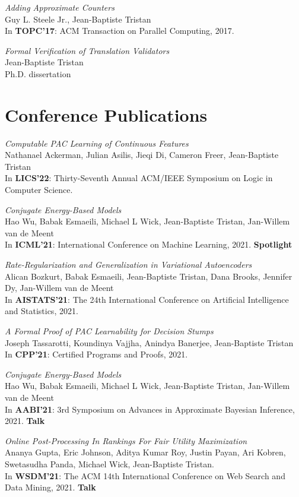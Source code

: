 \documentclass[margin,line]{res}
\begin{document}
\begin{resume}
\emph{Adding Approximate Counters}\\
Guy L. Steele Jr., Jean-Baptiste Tristan\\
In {\bf TOPC'17}: ACM Transaction on Parallel Computing, 2017.

\emph{Formal Verification of Translation Validators}\\
Jean-Baptiste Tristan\\
Ph.D. dissertation

\section{\sc Conference Publications}

\emph{Computable PAC Learning of Continuous Features}\\
Nathanael Ackerman, Julian Asilis, Jieqi Di, Cameron Freer, Jean-Baptiste Tristan\\
In {\bf LICS'22}: Thirty-Seventh Annual ACM/IEEE Symposium on
Logic in Computer Science.

\emph{Conjugate Energy-Based Models}\\
Hao Wu, Babak Esmaeili, Michael L Wick, Jean-Baptiste Tristan, Jan-Willem van de Meent\\
In {\bf ICML'21}: International Conference on Machine Learning, 2021. {\bf Spotlight}

\emph{Rate-Regularization and Generalization in Variational Autoencoders}\\
Alican Bozkurt, Babak Esmaeili, Jean-Baptiste Tristan, Dana Brooks, Jennifer Dy, Jan-Willem van de Meent\\
In {\bf AISTATS'21}: The 24th International Conference on
Artificial Intelligence and Statistics, 2021.

\emph{A Formal Proof of PAC Learnability for Decision Stumps}\\
Joseph Tassarotti, Koundinya Vajjha, Anindya Banerjee, Jean-Baptiste Tristan\\
In {\bf CPP'21}: Certified Programs and Proofs, 2021.

\emph{Conjugate Energy-Based Models}\\
Hao Wu, Babak Esmaeili, Michael L Wick, Jean-Baptiste Tristan, Jan-Willem van de Meent\\
In {\bf AABI'21}: 3rd Symposium on
Advances in Approximate Bayesian Inference, 2021. {\bf Talk}

\emph{Online Post-Processing In Rankings For Fair Utility Maximization}\\
Ananya Gupta, Eric Johnson, Aditya Kumar Roy, Justin Payan, Ari Kobren, Swetasudha Panda, Michael Wick, Jean-Baptiste Tristan.\\
In {\bf WSDM'21}: The ACM 14th International Conference on Web Search and Data Mining, 2021. {\bf Talk}


\end{resume}
\end{document}
